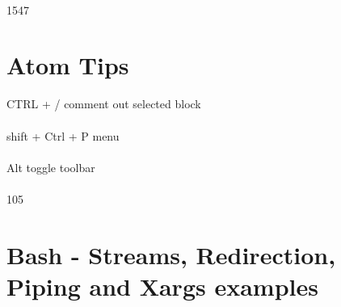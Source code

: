 \documentclass[10pt,a4paper]{article}
\begin{document}
\\
1547
\hypertarget{atom_tips}{\section {Atom Tips}}
{\large CTRL + /  		comment out selected block\\
\\
shift + Ctrl + P     	menu\\
\\
Alt     			toggle toolbar\\
\\
 }105
\hypertarget{bash_-_streams,_redirection,_piping_and_xargs_examples}{\section {Bash - Streams, Redirection, Piping and Xargs examples}}
\end{document}
